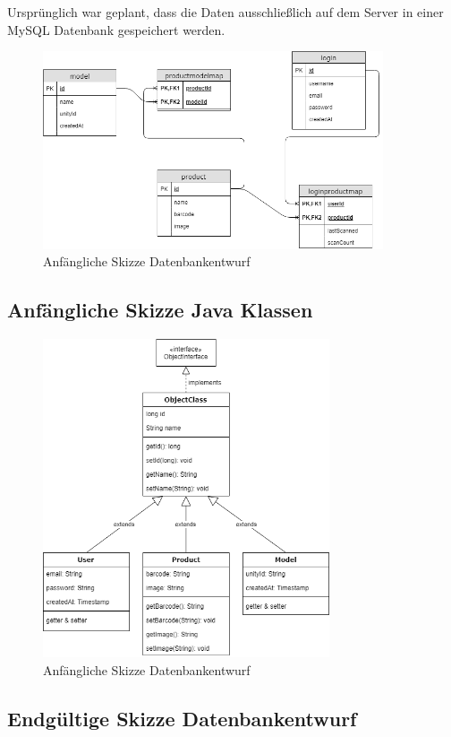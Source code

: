 \documentclass{scrartcl}
\begin{document}
Ursprünglich war geplant, dass die Daten ausschließlich auf dem Server in einer MySQL Datenbank gespeichert werden.

\begin{figure}[h]
\centering
\includegraphics[width=380px]{img/Skizze_Datenbank_1.png}
\caption{Anfängliche Skizze Datenbankentwurf}
\end{figure}

\newpage

\subsection{Anfängliche Skizze Java Klassen}

\begin{figure}[h]
\centering
\includegraphics[width=320px]{img/Skizze_Java_1.png}
\caption{Anfängliche Skizze Datenbankentwurf}
\end{figure}

\newpage

\subsection{Endgültige Skizze Datenbankentwurf}
\end{document}
